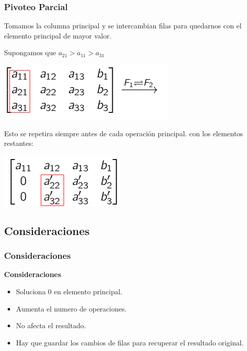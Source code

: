 \documentclass[xcolor=svgnames]{beamer} %
\theoremstyle{plain}
\renewcommand{\textbf}[1]{{\bfseries\textcolor{redUnq2}{#1}}}
\theoremstyle{definition}
\begin{document}
\begin{frame}
\frametitle{Pivoteo Parcial}
Tomamos la columna principal y se intercambian filas para quedarnos con el elemento principal de mayor valor.

Supongamos que $a_{21}>a_{11}>a_{31}$

\begin{center}
	\includegraphics[scale=0.7]{Mat_pivot1.png} 
\end{center}

%

\pause Esto se repetira siempre antes de cada operación principal. con los elementos restantes:

\begin{center}
	\includegraphics[scale=0.7]{Mat_pivot2.png} 
\end{center}
%

\end{frame}

\subsection{Consideraciones}

\begin{frame}
\frametitle{Consideraciones}

\textbf{Consideraciones}
\pause
\begin{itemize}
\item Soluciona 0 en elemento principal.
\item Aumenta el numero de operaciones.
\item No afecta el resultado.
\item Hay que guardar los cambios de filas para recuperar el resultado original.

\end{itemize}

\end{frame}
\end{document}
